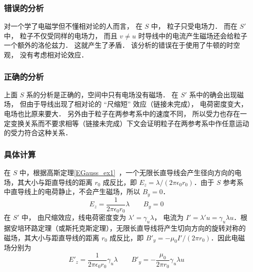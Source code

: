 \subsubsection{错误的分析}
对一个学了电磁学但不懂相对论的人而言， 在 $S$ 中， 粒子只受电场力． 而在 $S'$ 中， 粒子不仅受同样的电场力， 而且 $v \ne u$ 时导线中的电流产生磁场还会给粒子一个额外的洛伦兹力． 这就产生了矛盾． 该分析的错误在于使用了牛顿的时空观， 没有考虑相对论效应．

\subsubsection{正确的分析}
上面 $S$ 系的分析是正确的，空间中只有电场没有磁场． 在 $S'$ 系中的确会出现磁场， 但由于导线出现了相对论的 “尺缩短” 效应（链接未完成）， 电荷密度变大， 电场也比原来要大． 另外由于粒子在两参考系中的速度不同， 所以受力也存在一定变换关系而不要求相等（链接未完成）下文会证明粒子在两参考系中作任意运动的受力符合这种关系．

\subsubsection{具体计算}
在 $S$ 中，根据高斯定理\autoref{EGauss_ex1}~，一个无限长直导线会产生径向方向的电场，其大小与距直导线的距离 $r_0$ 成反比，即 $E_z=\lambda/(2\pi\epsilon_0r_0)$．由于 $S$ 参考系中直导线上的电荷静止，不会产生磁场，所以 $B_y=0$．
\begin{equation}
E_{z} = \frac{1}{2\pi\epsilon_0 r_0} \lambda
\qquad
B_{y} = 0
\end{equation}
在 $S'$ 中， 由尺缩效应，线电荷密度变为 $\lambda' = \gamma_u \lambda$， 电流为 $I' = \lambda' u = \gamma_u \lambda u$．根据安培环路定理（或斯托克斯定理），无限长直导线将产生切向方向的旋转对称的磁场，其大小与距直导线的距离 $r_0$ 成反比，即 $B'_y=-\mu_0 I' /(2\pi r_0)$．因此电磁场分别为
\begin{equation}
E'_z = \frac{1}{2\pi\epsilon_0 r_0} \gamma_u \lambda
\qquad
B'_y = -\frac{\mu_0}{2\pi r_0}\gamma_u \lambda u
\end{equation}

